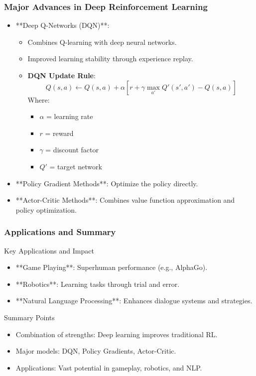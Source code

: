 \documentclass[aspectratio=169]{beamer}
\begin{document}
\begin{frame}[fragile]
    \frametitle{Major Advances in Deep Reinforcement Learning}
    \begin{itemize}
        \item **Deep Q-Networks (DQN)**:
        \begin{itemize}
            \item Combines Q-learning with deep neural networks.
            \item Improved learning stability through experience replay.
            \item \textbf{DQN Update Rule}:
            \begin{equation}
            Q(s, a) \leftarrow Q(s, a) + \alpha \left[r + \gamma \max_{a'} Q'(s', a') - Q(s, a)\right]
            \end{equation}
            Where:
            \begin{itemize}
                \item \( \alpha \) = learning rate
                \item \( r \) = reward
                \item \( \gamma \) = discount factor
                \item \( Q' \) = target network
            \end{itemize}
        \end{itemize}
        
        \item **Policy Gradient Methods**: Optimize the policy directly.
        \item **Actor-Critic Methods**: Combines value function approximation and policy optimization.
    \end{itemize}
\end{frame}

\begin{frame}[fragile]
    \frametitle{Applications and Summary}
    \begin{block}{Key Applications and Impact}
        \begin{itemize}
            \item **Game Playing**: Superhuman performance (e.g., AlphaGo).
            \item **Robotics**: Learning tasks through trial and error.
            \item **Natural Language Processing**: Enhances dialogue systems and strategies.
        \end{itemize}
    \end{block}
    
    \begin{block}{Summary Points}
        \begin{itemize}
            \item Combination of strengths: Deep learning improves traditional RL.
            \item Major models: DQN, Policy Gradients, Actor-Critic.
            \item Applications: Vast potential in gameplay, robotics, and NLP.
        \end{itemize}
    \end{block}
\end{frame}
\end{document}
